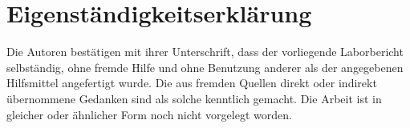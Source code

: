 \documentclass[../main.tex]{subfiles}
\begin{document}
\section{Eigenständigkeitserklärung}

Die Autoren bestätigen mit ihrer Unterschrift, dass der vorliegende Laborbericht selbständig, ohne fremde Hilfe und ohne Benutzung anderer als der angegebenen Hilfsmittel angefertigt wurde. Die aus fremden Quellen direkt oder indirekt übernommene Gedanken sind als solche kenntlich gemacht. Die Arbeit ist in gleicher oder ähnlicher Form noch nicht vorgelegt worden.

\begin{figure}[h]
  \centering
  
  \label{sign_line} 
\end{figure}
\end{document}
